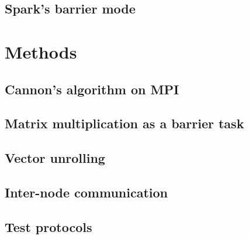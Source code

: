 \documentclass[fleqn,10pt]{SelfArx} %
\begin{document}

\subsection{Spark's barrier mode} %
\label{sub:spark_s_barrier_mode}



\section{Methods} %
\label{sec:methods}

\subsection{Cannon's algorithm on MPI} %
\label{sub:cannon_s_algorithm_on_mpi}


\subsection{Matrix multiplication as a barrier task} %
\label{sub:matrix_multiplication_as_a_barrier_task}


\subsection{Vector unrolling} %
\label{sub:vector_unrolling}


\subsection{Inter-node communication} %
\label{sub:inter_node_communication}


\subsection{Test protocols} %
\label{sub:test_protocols}


\end{document}
